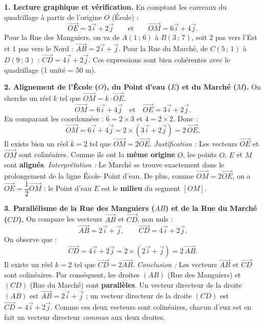 \documentclass[11pt]{article}
\newcounter{popsec}
\newcounter{popsub}
\newcommand{\courssub}[1]{%
  \stepcounter{popsub}%
  \par\vspace{9pt}\noindent{\popxbold\fontsize{11.5}{13}\selectfont\color{popink}{\color{poporange}\thepopsec.\thepopsub}\hspace{6pt}#1}\par\nopagebreak\vspace{4pt}
}
\begin{document}
\courssub{Démarche et corrigé commenté}
\begin{exoresolu}
\textbf{1. Lecture graphique et vérification.}
En comptant les carreaux du quadrillage à partir de l'origine $O$ (École) :
\[
\overrightarrow{OE} = 3\vec{i} + 2\vec{j} \qquad \text{et} \qquad \overrightarrow{OM} = 6\vec{i} + 4\vec{j}.
\]
Pour la Rue des Manguiers, on va de $A(1\,;\,6)$ à $B(3\,;\,7)$, soit $2$ pas vers l'Est et $1$ pas vers le Nord : $\overrightarrow{AB} = 2\vec{i} + \vec{j}$.
Pour la Rue du Marché, de $C(5\,;\,1)$ à $D(9\,;\,3)$ : $\overrightarrow{CD} = 4\vec{i} + 2\vec{j}$.
Ces expressions sont bien cohérentes avec le quadrillage (1 unité = 50 m).

\textbf{2. Alignement de l'École ($O$), du Point d'eau ($E$) et du Marché ($M$).}
On cherche un réel $k$ tel que $\overrightarrow{OM} = k \cdot \overrightarrow{OE}$.
\[
\overrightarrow{OM} = 6\vec{i} + 4\vec{j} \quad \text{et} \quad \overrightarrow{OE} = 3\vec{i} + 2\vec{j}.
\]
En comparant les coordonnées : $6 = 2 \times 3$ et $4 = 2 \times 2$. Donc :
\[
\overrightarrow{OM} = 6\vec{i} + 4\vec{j} = 2 \times (3\vec{i} + 2\vec{j}) = 2\,\overrightarrow{OE}.
\]
Il existe bien un réel $k = 2$ tel que $\overrightarrow{OM} = 2\overrightarrow{OE}$.
\emph{Justification :} Les vecteurs $\overrightarrow{OE}$ et $\overrightarrow{OM}$ sont colinéaires. Comme ils ont la \textbf{même origine} $O$, les points $O$, $E$ et $M$ sont \textbf{alignés}.
\emph{Interprétation :} Le Marché se trouve exactement dans le prolongement de la ligne École–Point d'eau. De plus, comme $\overrightarrow{OM} = 2\overrightarrow{OE}$, on a $\overrightarrow{OE} = \dfrac{1}{2}\overrightarrow{OM}$ : le Point d'eau $E$ est le \textbf{milieu} du segment $[OM]$.

\textbf{3. Parallélisme de la Rue des Manguiers ($AB$) et de la Rue du Marché ($CD$).}
On compare les vecteurs $\overrightarrow{AB}$ et $\overrightarrow{CD}$, non nuls :
\[
\overrightarrow{AB} = 2\vec{i} + \vec{j}, \qquad \overrightarrow{CD} = 4\vec{i} + 2\vec{j}.
\]
On observe que :
\[
\overrightarrow{CD} = 4\vec{i} + 2\vec{j} = 2 \times (2\vec{i} + \vec{j}) = 2\,\overrightarrow{AB}.
\]
Il existe un réel $k = 2$ tel que $\overrightarrow{CD} = 2\overrightarrow{AB}$.
\emph{Conclusion :} Les vecteurs $\overrightarrow{AB}$ et $\overrightarrow{CD}$ sont colinéaires. Par conséquent, les droites $(AB)$ (Rue des Manguiers) et $(CD)$ (Rue du Marché) sont \textbf{parallèles}.
Un vecteur directeur de la droite $(AB)$ est $\overrightarrow{AB} = 2\vec{i} + \vec{j}$ ; un vecteur directeur de la droite $(CD)$ est $\overrightarrow{CD} = 4\vec{i} + 2\vec{j}$. Comme ces deux vecteurs sont colinéaires, chacun d'eux est en fait un vecteur directeur \emph{commun} aux deux droites.


\end{exoresolu}
\end{document}
